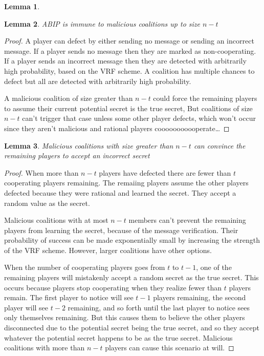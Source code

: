 \documentclass{dalcsthesis}
\newtheorem{lemma}{Lemma}
\begin{document}
\begin{lemma}

\end{lemma}
\begin{lemma} ABIP is immune to malicious coalitions up to size $n-t$ \end{lemma}
\begin{proof}
A player can defect by either sending no message or sending an incorrect message. If a player sends no message then they are marked as non-cooperating. If a player sends an incorrect message then they are detected with arbitrarily high probability, based on the VRF scheme. A coalition has multiple chances to defect but all are detected with arbitrarily high probability.

A malicious coalition of size greater than $n-t$ could force the remaining players to assume their current potential secret is the true secret, But coalitions of size $n-t$ can't trigger that case unless some other player defects, which won't occur since they aren't malicious and rational players cooooooooooperate\ldots
\end{proof}

\begin{lemma} Malicious coalitions with size greater than $n-t$ can convince the remaining players to accept an incorrect secret \end{lemma}
\begin{proof}
When more than $n-t$ players have defected there are fewer than $t$ cooperating players remaining. The remaiing players assume the other players defected because they were rational and learned the secret. They accept a random value as the secret. 

Malicious coalitions with at most $n-t$ members can't prevent the remaining players from learning the secret, because of the message verification. Their probability of success can be made exponentially small by increasing the strength of the VRF scheme. However, larger coalitions have other options. 

When the number of cooperating players goes from $t$ to $t-1$, one of the remaining players will mistakenly accept a random secret as the true secret. This occurs because players stop cooperating when they realize fewer than $t$ players remain. The first player to notice will see $t-1$ players remaining, the second player will see $t-2$ remaining, and so forth until the last player to notice sees only themselves remaining. But this causes them to believe the other players disconnected due to the potential secret being the true secret, and so they accept whatever the potential secret happens to be as the true secret. Malicious coalitions with more than $n-t$ players can cause this scenario at will.
\end{proof}
\end{document}
